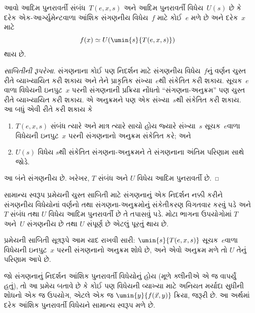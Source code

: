 \begin{thm}[ક્લીનીનું સામાન્ય સ્વરૂપ પ્રમેય]
આવો આદિમ પુનરાવર્તી સંબંધ~$T(e,x,s)$ અને આદિમ પુનરાવર્તી
વિધેય~$U(s)$ છે કે દરેક એક-આર્ગ્યુમેન્ટવાળા આંશિક સંગણનીય
વિધેય~$f$ માટે કોઈ~$e$ મળે છે અને દરેક~$x$ માટે
\[
f(x) \simeq U(\umin{s}{T(e,x,s)})
\]
થાય છે.
\end{thm}

\begin{proof}[સાબિતીની રૂપરેખા]
સંગણનાના કોઈ પણ નિદર્શન માટે સંગણનીય વિધેય~$f$નું વર્ણન ચુસ્ત રીતે
વ્યાખ્યાયિત કરી શકાય અને તેને પ્રાકૃતિક સંખ્યા~$e$થી સંકેતિત કરી
શકાય. સૂચક~$e$વાળા વિધેયની ઇનપુટ~$x$ પરની સંગણનાની પ્રક્રિયા
નોંધતો ``સંગણના-અનુક્રમ'' પણ ચુસ્ત રીતે વ્યાખ્યાયિત કરી શકાય. એ
અનુક્રમને પણ એક સંખ્યા~$s$થી સંકેતિત કરી શકાય. આ બધું એવી રીતે
કરી શકાય કે
\begin{enumerate}
  \item $T(e,x,s)$ સંબંધ ત્યારે અને માત્ર ત્યારે સાચો હોય જ્યારે
  સંખ્યા~$s$ સૂચક~$e$વાળા વિધેયની ઇનપુટ~$x$ પરની સંગણનાનો
  અનુક્રમ સંકેતિત કરે; અને
  \item $U(s)$ વિધેય $s$થી સંકેતિત સંગણના-અનુક્રમને તે
  સંગણનાના અંતિમ પરિણામ સાથે જોડે.
\end{enumerate}
આ બંને સંગણનીય છે. ખરેખર, $T$ સંબંધ અને $U$ વિધેય આદિમ
પુનરાવર્તી છે.
\end{proof}

\begin{explain}
સામાન્ય સ્વરૂપ પ્રમેયની ચુસ્ત સાબિતી માટે સંગણનાનું એક નિદર્શન
નક્કી કરીને સંગણનીય વિધેયોનાં વર્ણનો તથા સંગણના-અનુક્રમોનું
સંકેતીકરણ વિગતવાર કરવું પડે અને $T$ સંબંધ તથા $U$ વિધેય
આદિમ પુનરાવર્તી છે તે તપાસવું પડે. મોટા ભાગના ઉપયોગોમાં $T$
અને~$U$ સંગણનીય છે તથા $U$ સંપૂર્ણ છે એટલું પૂરતું થાય છે.

પ્રમેયની સાબિતી સૂત્રરૂપે આમ યાદ રાખવી સારી: $\umin{s}{T(e,x,s)}$
સૂચક~$e$વાળા વિધેયની ઇનપુટ~$x$ પરની સંગણનાનો અનુક્રમ શોધે છે,
અને એવો અનુક્રમ મળે તો $U$ તેનું પરિણામ આપે છે.
\end{explain}

જો સંગણનાનું નિદર્શન આંશિક પુનરાવર્તી વિધેયોનું હોય (મૂળે
ક્લીનીએ એ જ વાપર્યું હતું), તો આ પ્રમેય બતાવે છે કે કોઈ પણ
વિધેયની વ્યાખ્યા માટે અનિયત મર્યાદા સુધીની શોધનો એક જ ઉપયોગ,
એટલે એક જ $\umin{y}{f(\vec x,y)}$ ક્રિયા, જરૂરી છે. આ અર્થમાં
દરેક આંશિક પુનરાવર્તી વિધેયને સામાન્ય સ્વરૂપ મળે છે.

